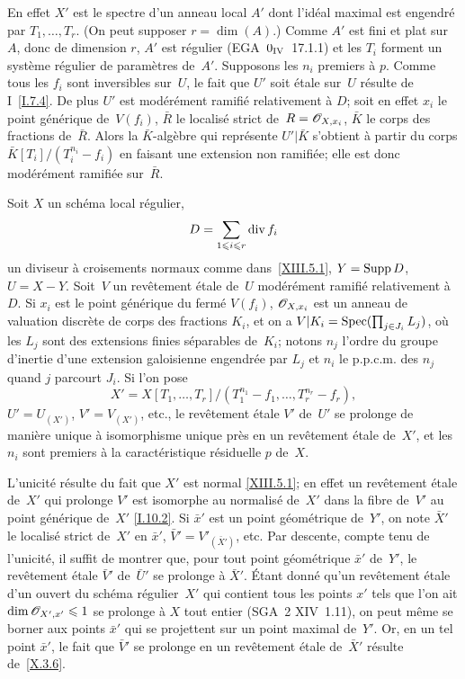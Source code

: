 En effet $X'$ est le spectre d'un anneau local $A'$ dont l'id\'eal
maximal est engendr\'e par $T_1,\dots,T_r$.
(On peut supposer $r=\dim(A)$.)
Comme $A'$ est fini et plat sur~$A$, donc de dimension $r$, $A'$ est
r\'egulier (EGA~$0_{\textup{IV}}$~17.1.1) et les $T_i$ forment un syst\`eme
r\'egulier de param\`etres de~$A'$. Supposons les $n_i$ premiers
\`a $p$. Comme tous les $f_i$ sont inversibles sur~$U$, le fait que
$U'$ soit \'etale sur~$U$ r\'esulte de I~\ref{I.7.4}. De plus $U'$
est mod\'er\'ement ramifi\'e relativement \`a $D$; soit en
effet $x_i$ le point g\'en\'erique de~$V(f_i)$, $\bar{R}$ le
localis\'e strict de~$R=\cal{O}_{X,x_i}$, $\bar{K}$ le corps des
fractions de~$\bar{R}$. Alors la $\bar{K}$-alg\`ebre qui
repr\'esente $U'|\bar{K}$ s'obtient \`a partir du corps
$\bar{K}[T_i]/(T_i^{n_i}-f_i)$ en faisant une extension non
ramifi\'ee; elle est donc mod\'er\'ement ramifi\'ee sur~$\bar{R}$.

\begin{proposition}
\label{XIII.5.2}
Soit $X$ un sch\'ema local r\'egulier,
$$
D=\sum_{1\leqslant i\leqslant r} \operatorname{\mathrm{div}} f_i
$$
un diviseur \`a croisements normaux comme dans~\ref{XIII.5.1},
$Y=\operatorname{Supp} D$, $U=X-Y$. Soit~$V$ un rev\^etement \'etale de~$U$
mod\'er\'ement ramifi\'e relativement \`a $D$. Si $x_i$ est le
point g\'en\'erique du ferm\'e $V(f_i)$, $\cal{O}_{X,x_i}$ est
un anneau de valuation discr\`ete de corps des fractions $K_i$, et
on a $V|K_i=\operatorname{Spec}(\prod_{j\in J_i}L_j)$, o\`u les $L_j$ sont des
extensions finies s\'eparables de~$K_i$; notons $n_j$ l'ordre du
groupe d'inertie d'une extension galoisienne engendr\'ee par $L_j$
et $n_i$ le p.p.c.m. des $n_j$ quand $j$ parcourt $J_i$. Si l'on pose
$$
X'=X[T_1,\dots,T_r]/(T_1^{n_1}-f_1,\dots,T_r^{n_r}-f_r),
$$
$U'=U_{(X')}$, $V'=V_{(X')}$, etc., le rev\^etement \'etale $V'$
de~$U'$ se prolonge de mani\`ere unique \`a isomorphisme unique
pr\`es en un rev\^etement \'etale de~$X'$, et les $n_i$ sont
premiers \`a la caract\'eristique r\'esiduelle $p$ de~$X$.
\end{proposition}

L'unicit\'e r\'esulte du fait que $X'$ est normal
\eqref{XIII.5.1}; en effet
un rev\^etement \'etale de~$X'$ qui prolonge $V'$ est isomorphe au
normalis\'e de~$X'$ dans la fibre de~$V'$ au point g\'en\'erique
de~$X'$ \eqref{I.10.2}. Si $\bar{x}'$ est un point g\'eom\'etrique
de~$Y'$, on note $\bar{X}'$ le localis\'e strict de~$X'$ en
$\bar{x}'$, $\bar{V}'=V'_{(\bar{X}')}$, etc. Par descente, compte tenu
de l'unicit\'e, il suffit de montrer que, pour tout point
g\'eom\'etrique $\bar{x}'$ de~$Y'$, le rev\^etement \'etale
$\bar{V}'$ de~$\bar{U}'$ se prolonge \`a $\bar{X}'$. \'Etant donn\'e
qu'un rev\^etement \'etale d'un ouvert du sch\'ema r\'egulier~$X'$ qui contient tous les points $x'$ tels que l'on ait $\dim
\cal{O}_{X',x'}\leq 1$ se prolonge \`a $X$ tout entier
(SGA~2 XIV~1.11), on peut m\^eme se borner aux points $\bar{x}'$ qui
se projettent sur un point maximal de~$Y'$. Or, en un tel point
$\bar{x}'$, le fait que $\bar{V}'$ se prolonge en un rev\^etement
\'etale de~$\bar{X}'$ r\'esulte de~\ref{X.3.6}.

